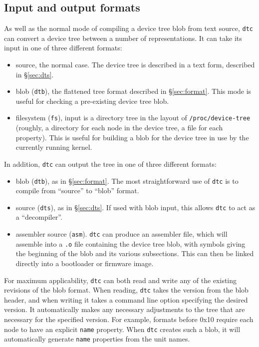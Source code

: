 \documentclass[a4paper,twocolumn]{article}
\newcommand{\dtc}{\texttt{dtc}\xspace}
\begin{document}
\subsection{Input and output formats}

As well as the normal mode of compiling a device tree blob from text
source, \dtc can convert a device tree between a number of
representations.  It can take its input in one of three different
formats:
\begin{itemize}
\item source, the normal case.  The device tree is described in a text
  form, described in \S\ref{sec:dts}.
\item blob (\texttt{dtb}), the flattened tree format described in
  \S\ref{sec:format}.  This mode is useful for checking a pre-existing
  device tree blob.
\item filesystem (\texttt{fs}), input is a directory tree in the
  layout of \texttt{/proc/device-tree} (roughly, a directory for each
  node in the device tree, a file for each property).  This is useful
  for building a blob for the device tree in use by the currently
  running kernel.
\end{itemize}

In addition, \dtc can output the tree in one of three different
formats:
\begin{itemize}
\item blob (\texttt{dtb}), as in \S\ref{sec:format}.  The most
  straightforward use of \dtc is to compile from ``source'' to
  ``blob'' format.
\item source (\texttt{dts}), as in \S\ref{sec:dts}.  If used with blob
  input, this allows \dtc to act as a ``decompiler''.
\item assembler source (\texttt{asm}).  \dtc can produce an assembler
  file, which will assemble into a \texttt{.o} file containing the
  device tree blob, with symbols giving the beginning of the blob and
  its various subsections.  This can then be linked directly into a
  bootloader or firmware image.
\end{itemize}

For maximum applicability, \dtc can both read and write any of the
existing revisions of the blob format.  When reading, \dtc takes the
version from the blob header, and when writing it takes a command line
option specifying the desired version.  It automatically makes any
necessary adjustments to the tree that are necessary for the specified
version.  For example, formats before 0x10 require each node to have
an explicit \texttt{name} property.  When \dtc creates such a blob, it
will automatically generate \texttt{name} properties from the unit
names.
\end{document}
